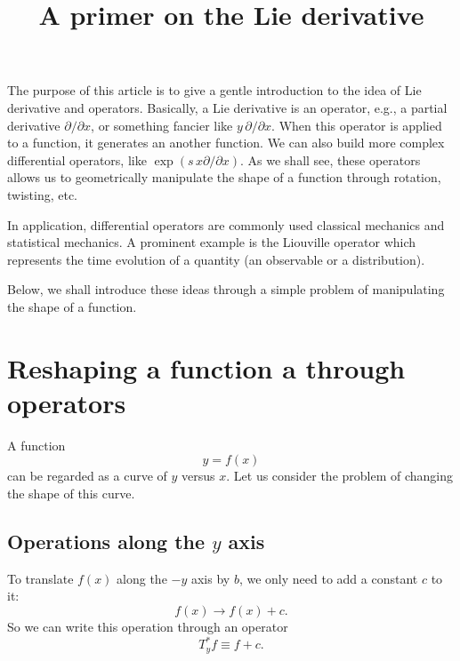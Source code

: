 \documentclass{article}
\begin{document}
\title{A primer on the Lie derivative}
\author{ \vspace{-10ex} }
\date{ \vspace{-10ex} }
\maketitle


The purpose of this article is to give a
gentle introduction to the idea of
Lie derivative and operators.
%
Basically, a Lie derivative is an operator,
e.g., a partial derivative $\partial/\partial x$,
or something fancier like $y \, \partial/\partial x$.
%
When this operator is applied to a function,
it generates an another function.
%
We can also build more complex differential operators, like
$\exp(s \, x \partial/\partial x)$.
%
As we shall see,
these operators allows us to
geometrically manipulate the shape
of a function through rotation, twisting, etc.

In application,
differential operators are commonly used classical mechanics
and statistical mechanics.
%
A prominent example is the Liouville operator
which represents the time evolution of
a quantity (an observable or a distribution).

Below, we shall introduce these ideas through
a simple problem of manipulating the shape of a function.



\section{Reshaping a function a through operators}


A function
\begin{equation}
  y = f(x)
  \label{eq:y_fx}
\end{equation}
can be regarded as a curve of $y$ versus $x$.
Let us consider the problem of changing the shape of this curve.


\subsection{Operations along the $y$ axis}

To translate $f(x)$ along the $-y$ axis by $b$,
we only need to add a constant $c$ to it:
\begin{equation}
  f(x) \rightarrow f(x) + c.
  \label{eq:ys_shift}
\end{equation}
So we can write this operation through an operator
\begin{equation}
  T_y^* f \equiv f + c.
  \label{eq:ys_shift2}
\end{equation}
\end{document}
